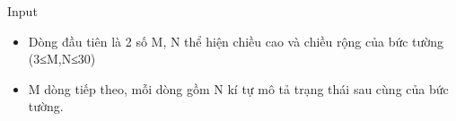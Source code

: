 Input
\begin{itemize}
	\item Dòng đầu tiên là 2 số M, N thể hiện chiều cao và chiều rộng của bức tường (3≤M,N≤30)
	\item M dòng tiếp theo, mỗi dòng gồm N kí tự mô tả trạng thái sau cùng của bức tường.
\end{itemize}

 